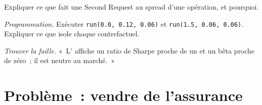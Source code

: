 \begin{exercise}[$\star\star$]\label{exo:s1:merger-arbitrage:6}
Expliquer ce que fait une Second Request au spread d'une opération, et pourquoi.
\end{exercise}

\begin{exercise}[$\star\star\star$]\label{exo:s1:merger-arbitrage:7}
\emph{Programmation.} Exécuter \texttt{run(0.0, 0.12, 0.06)} et \texttt{run(1.5, 0.06, 0.06)}. Expliquer ce que isole chaque contrefactuel.
\end{exercise}

\begin{exercise}[$\star\star\star$]\label{exo:s1:merger-arbitrage:8}
\emph{Trouver la faille.} «~L' affiche un ratio de Sharpe proche de un et un bêta proche de zéro~; il est neutre au marché.~»
\end{exercise}

\section{Problème~: vendre de l'assurance}

